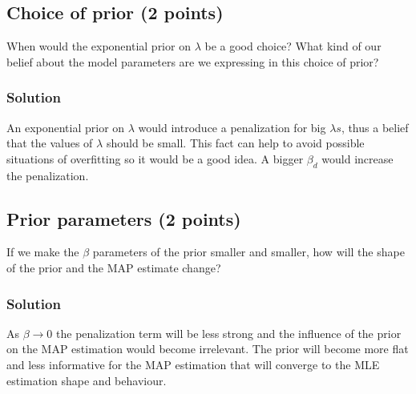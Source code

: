 \documentclass[a4paper,12pt]{article}
\begin{document}
\subsection{Choice of prior (2 points)}
When would the exponential prior on $\lambda$ be a good choice? What kind of our belief about the model parameters are we expressing in this choice of prior?

\subsubsection{Solution}
An exponential prior on $\lambda$ would introduce a penalization for big $\lambda s$, thus a belief that the values of $\lambda$ should be small. This fact can help to avoid possible situations of overfitting so it would be a good idea. A bigger $\beta_d$ would increase the penalization. 

\subsection{Prior parameters (2 points)}
If we make the $\beta$ parameters of the prior smaller and smaller, how will the shape of the prior and the MAP estimate change?

\subsubsection{Solution}

As $\beta \rightarrow 0$ the penalization term will be less strong and the influence of the prior on the MAP estimation would become irrelevant. The prior will become more flat and less informative for the MAP estimation that will converge to the MLE estimation shape and behaviour.
\end{document}
